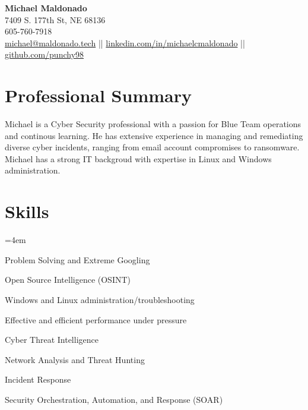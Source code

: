 \documentclass[a4paper,10pt]{article}
\begin{document}
\begin{center}
    \textbf{\LARGE Michael Maldonado} \\
    7409 S. 177th St, NE 68136 \\
    605-760-7918 \\
    \href{mailto:michael@maldonado.tech}{michael@maldonado.tech} ||
    \href{https://linkedin.com/in/michaelcmaldonado}{linkedin.com/in/michaelcmaldonado} ||
    \href{https://github.com/punchy98}{github.com/punchy98} 
\end{center}

\section*{Professional Summary}
Michael is a Cyber Security professional with a passion for Blue Team operations and continous learning. He has extensive experience in managing and remediating diverse cyber incidents, ranging from email account compromises to ransomware. Michael has a strong IT backgroud with expertise in Linux and Windows administration.
\section*{Skills}
\begin{itemize}
    \begin{multicols}{2}
    \small
    \leftskip=4em
    \item Problem Solving and Extreme Googling
    \item Open Source Intelligence (OSINT)
    \item Windows and Linux administration/troubleshooting
    \item Effective and efficient performance under pressure
    \item Cyber Threat Intelligence
    \item Network Analysis and Threat Hunting
    \item Incident Response
    \item Security Orchestration, Automation, and Response (SOAR)
    \end{multicols}
\end{itemize}
\end{document}
